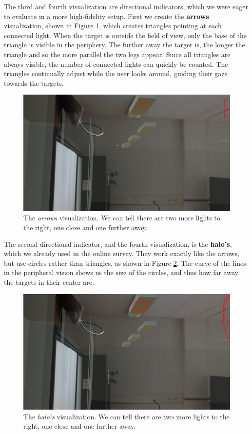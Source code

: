 The third and fourth visualization are directional indicators, which we were eager to evaluate in a more high-fidelity setup. First we create the \textbf{arrows} visualization, shown in Figure \ref{fig:arrows_vis}, which creates triangles pointing at each connected light. When the target is outside the field of view, only the base of the triangle is visible in the periphery. The further away the target is, the longer the triangle and so the more parallel the two legs appear. Since all triangles are always visible, the number of connected lights can quickly be counted. The triangles continually adjust while the user looks around, guiding their gaze towards the targets.

\begin{figure}
    \centering
    \includegraphics[width=1.0\linewidth]{resources/implementation/arrows.jpg}
    \caption{The \textit{arrows} visualization. We can tell there are two more lights to the right, one close and one further away.}
    \label{fig:arrows_vis}
\end{figure}

The second directional indicator, and the fourth visualization, is the \textbf{halo's}, which we already used in the online survey. They work exactly like the arrows, but use circles rather than triangles, as shown in Figure \ref{fig:halos_vis}. The curve of the lines in the peripheral vision shows us the size of the circles, and thus how far away the targets in their center are.

\begin{figure}
    \centering
    \includegraphics[width=1.0\linewidth]{resources/implementation/halos.jpg}
    \caption{The \textit{halo's} visualization. We can tell there are two more lights to the right, one close and one further away.}
    \label{fig:halos_vis}
\end{figure}

